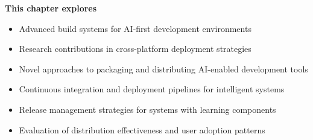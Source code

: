 \begin{tcolorbox}[
    enhanced,
    colback=white,
    colframe=brandPrimary!40,
    boxrule=1pt,
    arc=12pt,
    drop shadow={brandPrimary!20},
    left=1.5cm,
    right=1.5cm,
    top=1.2cm,
    bottom=1.2cm,
    before upper={\parindent0pt}
]
\begin{center}
{\Large\textbf{\textcolor{brandPrimary}{This chapter explores}}}
\end{center}

\vspace{0.8cm}

\begin{itemize}[leftmargin=1.2cm, itemsep=0.4cm, label={\textcolor{brandAccent}{$\triangleright$}}]
    \item {\large Advanced build systems for AI-first development environments}
    \item {\large Research contributions in cross-platform deployment strategies}
    \item {\large Novel approaches to packaging and distributing AI-enabled development tools}
    \item {\large Continuous integration and deployment pipelines for intelligent systems}
    \item {\large Release management strategies for systems with learning components}
    \item {\large Evaluation of distribution effectiveness and user adoption patterns}
\end{itemize}
\end{tcolorbox}

\clearpage
